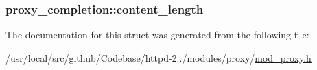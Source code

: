 \subsubsection[{\texorpdfstring{content\+\_\+length}{content_length}}]{ proxy\+\_\+completion\+::content\+\_\+length}\hypertarget{structproxy__completion_ad8a5f4c4146e7b7aee9ea6f9018b4153}{}\label{structproxy__completion_ad8a5f4c4146e7b7aee9ea6f9018b4153}


The documentation for this struct was generated from the following file\+:\begin{DoxyCompactItemize}
\item 
/usr/local/src/github/\+Codebase/httpd-\/2../modules/proxy/\hyperlink{mod__proxy_8h}{mod\+\_\+proxy.\+h}\end{DoxyCompactItemize}
